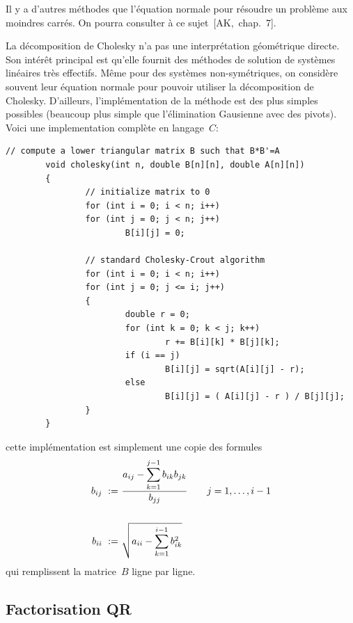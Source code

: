 \begin{remark}
Il y a d'autres méthodes que l'équation normale pour résoudre un problème aux
moindres carrés. On pourra consulter à ce sujet~[AK,~chap.~7].
\end{remark}

La décomposition de Cholesky n'a pas une interprétation géométrique directe.
Son intérêt principal est qu'elle fournit des méthodes de solution de
systèmes linéaires très effectifs.  Même pour des systèmes non-symétriques,
on considère souvent leur équation normale pour pouvoir utiliser la
décomposition de Cholesky.  D'ailleurs, l'implémentation de la méthode est
des plus simples possibles (beaucoup plus simple que l'élimination Gausienne
avec des pivots).  Voici une implementation complète en langage~$C$:


\begin{Verbatim}[fontsize=\scriptsize]
        // compute a lower triangular matrix B such that B*B'=A
        void cholesky(int n, double B[n][n], double A[n][n])
        {
                // initialize matrix to 0
                for (int i = 0; i < n; i++)
                for (int j = 0; j < n; j++)
                        B[i][j] = 0;

                // standard Cholesky-Crout algorithm
                for (int i = 0; i < n; i++)
                for (int j = 0; j <= i; j++)
                {
                        double r = 0;
                        for (int k = 0; k < j; k++)
                                r += B[i][k] * B[j][k];
                        if (i == j)
                                B[i][j] = sqrt(A[i][j] - r);
                        else
                                B[i][j] = ( A[i][j] - r ) / B[j][j];
                }
        }
\end{Verbatim}

cette implémentation est simplement une copie des formules
\begin{align*}
	b_{ij} \ :=\  & \displaystyle\frac{\displaystyle a_{ij}-\sum_{k=1}^{j-1}b_{ik}b_{jk}}{b_{jj}} 
	\qquad j=1,\ldots, i-1
	\\
	& \\
	b_{ii} \ :=\  & \displaystyle\sqrt{a_{ii}-\sum_{k=1}^{i-1}b^2_{ik}}
\end{align*}
qui remplissent la matrice~$B$ ligne par ligne.




\subsection{Factorisation QR}

